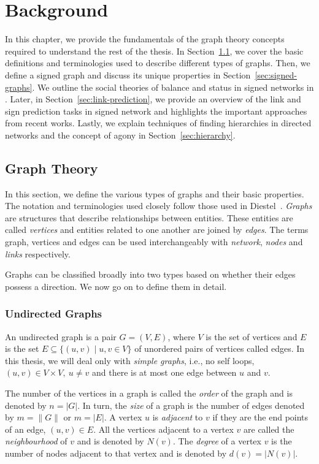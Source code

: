 
\chapter{Background}
\label{chp:background}

In this chapter, we provide the fundamentals of the graph theory concepts required to understand the rest of the thesis.
In Section~\ref{sec:prelim}, we cover the basic definitions and terminologies used to describe different types of graphs.
Then, we define a signed graph and discuss its unique properties in Section~\ref{sec:signed-graphs}.
We outline the social theories of balance and status in signed networks in .
Later, in Section~\ref{sec:link-prediction}, we provide an overview of the link and sign prediction tasks in signed network and highlights the important approaches from recent works.
Lastly, we explain techniques of finding hierarchies in directed networks and the concept of agony in Section~\ref{sec:hierarchy}.

\section{Graph Theory}
\label{sec:prelim}
In this section, we define the various types of graphs and their basic properties.
The notation and terminologies used closely follow those used in Diestel~\cite{diestel1997graph}.
\textit{Graphs} are structures that describe relationships between entities.
These entities are called \textit{vertices} and entities related to one another are joined by \textit{edges}.
The terms graph, vertices and edges can be used interchangeably with \textit{network}, \textit{nodes} and \textit{links} respectively.

Graphs can be classified broadly into two types based on whether their edges possess a direction.
We now go on to define them in detail.
\subsection{Undirected Graphs}
An undirected graph is a pair $G=(V,E)$, where $V$ is the set of vertices and $E$ is the set $E \subseteq \{ (u,v) \mid u,v \in V\}$ of unordered pairs of vertices called edges.
In this thesis, we will deal only with \textit{simple graphs}, i.e., no self loops, $(u,v)\in V \times V, ~ u\neq v$ and there is at most one edge between $u$ and $v$. 

The number of the vertices in a graph is called the \textit{order} of the graph and is denoted by $n= |G|$.
In turn, the \textit{size} of a graph is the number of edges denoted by $m = \|G\|$ or $m=|E|$.
A vertex $u$ is \textit{adjacent} to $v$ if they are the end points of an edge, $(u,v) \in E$.
All the vertices adjacent to a vertex $v$ are called the \textit{neighbourhood} of $v$ and is denoted by $N(v)$.
The \textit{degree} of a vertex $v$ is the number of nodes adjacent to that vertex and is denoted by $d(v) = |N(v)|$. 

